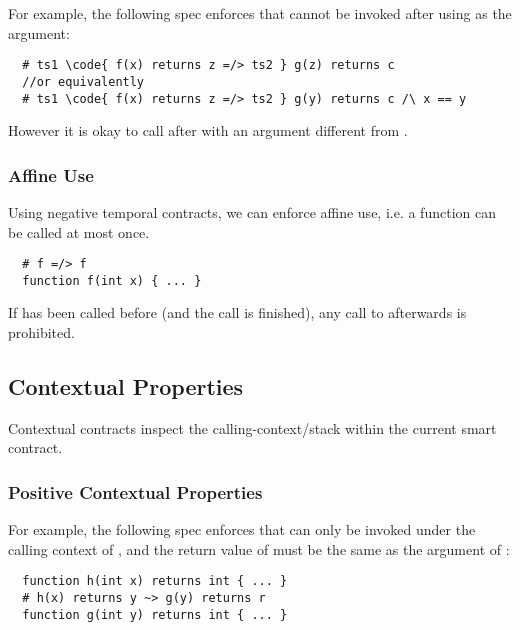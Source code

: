 For example, the following spec enforces that  cannot be
invoked after  using  as the argument:
\begin{lstlisting}
  # ts1 \code{ f(x) returns z =/> ts2 } g(z) returns c
  //or equivalently
  # ts1 \code{ f(x) returns z =/> ts2 } g(y) returns c /\ x == y
\end{lstlisting}
However it is okay to call  after  with an argument different from .

\subsubsection*{Affine Use}

Using negative temporal contracts, we can enforce affine use, i.e.
a function can be called at most once.
\begin{lstlisting}
  # f =/> f
  function f(int x) { ... }
\end{lstlisting}
If  has been called before (and the call is finished), any
call to  afterwards is prohibited.



\subsection{Contextual Properties}

Contextual contracts inspect the calling-context/stack within the
current smart contract.


\subsubsection{Positive Contextual Properties}

For example, the following spec enforces that  can only be invoked
under the calling context of , and the return value of  must be
the same as the argument of :

\begin{lstlisting}
  function h(int x) returns int { ... }
  # h(x) returns y ~> g(y) returns r
  function g(int y) returns int { ... }
\end{lstlisting}

